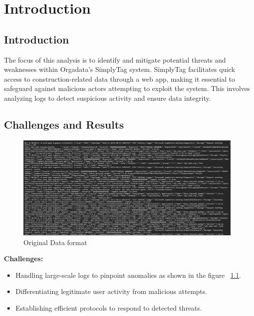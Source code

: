 %
%

\chapter{Introduction}

\section{Introduction}

The focus of this analysis is to identify and mitigate potential threats and weaknesses within Orgadata’s SimplyTag system. SimplyTag facilitates quick access to construction-related data through a web app, making it essential to safeguard against malicious actors attempting to exploit the system. This involves analyzing logs to detect suspicious activity and ensure data integrity.

\section{Challenges and Results}

\begin{figure}
	\begin{center}
		\includegraphics[width=0.7\linewidth]{Images/Data_Img.png}
		\caption{Original Data format}
		\label{Data_Img} 
	\end{center}
\end{figure}

\textbf{Challenges:}
\begin{itemize}
	\item Handling large-scale logs to pinpoint anomalies as shown in the figure ~\ref{Data_Img}.
	\item Differentiating legitimate user activity from malicious attempts.
	\item Establishing efficient protocols to respond to detected threats.
\end{itemize}

